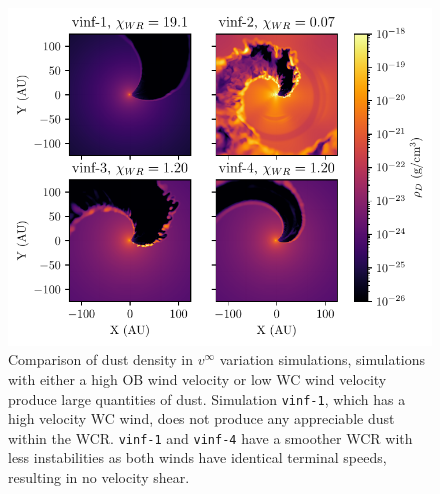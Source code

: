 \documentclass[fleqn,usenatbib]{mnras}
\begin{document}
\begin{figure}
  \centering
  \includegraphics[width=\linewidth]{assets/results/vinf/vinf-finished-rhod.pdf}
  \caption[Dust density comparison of terminal velocity varying systems]{Comparison of dust density in $v^\infty$ variation simulations, simulations with either a high OB wind velocity or low WC wind velocity produce large quantities of dust. Simulation \texttt{vinf-1}, which has a high velocity WC wind, does not produce any appreciable dust within the WCR. \texttt{vinf-1} and \texttt{vinf-4} have a smoother WCR with less instabilities as both winds have identical terminal speeds, resulting in no velocity shear.}
  \label{fig:vinfrhodcomp}
\end{figure}
\end{document}
